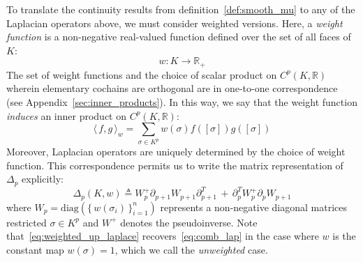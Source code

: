 \documentclass[10pt]{article}
\numberwithin{equation}{section}
\newcommand{\+}{%
	\raisebox{0.18ex}{\scaleobj{0.55}{+}}
}
\theoremstyle{definition}
\theoremstyle{definition}
\begin{document}
To translate the continuity results from definition~\ref{def:smooth_mu} to any of the Laplacian operators above, we must consider weighted versions. 
Here, a \emph{weight function} is a non-negative real-valued function defined over the set of all faces of $K$:
\begin{equation}\label{eq:weight_func} %
	w : K \to \mathbb{R}_+
\end{equation}
The set of weight functions and the choice of scalar product on $C^p(K, \mathbb{R})$ wherein elementary cochains are orthogonal are in one-to-one correspondence~\cite{} (see Appendix~\ref{sec:inner_products}). In this way, we say that the weight function \emph{induces} an inner product on $C^p(K, \mathbb{R})$:
\begin{equation}
	\langle \, f, g \, \rangle_{w} = \sum\limits_{\sigma \in K^p} w(\sigma) f([\sigma]) g([\sigma])
\end{equation}
Moreover, Laplacian operators are uniquely determined by the choice of weight function.  
This correspondence permits us to write the matrix representation of $\Delta_p$ explicitly: 
\begin{equation}\label{eq:weighted_up_laplace}
	\Delta_p(K, w) \triangleq  W_p^{+} \partial_{p+1} W_{p+1} \partial_{p+1}^T \, + \,  \partial_{p}^T W_p^{+} \partial_p W_{p+1} 
\end{equation} 
where $W_p = \mathrm{diag}(\{ \, w(\sigma_i) \, \}_{i=1}^n)$ represents a non-negative diagonal  matrices restricted $\sigma \in K^p$ and $W^+$ denotes the pseudoinverse. 
Note that~\eqref{eq:weighted_up_laplace} recovers~\eqref{eq:comb_lap} in the case where $w$ is the constant map $w(\sigma) = 1$, which we call the \emph{unweighted} case. 
\end{document}
